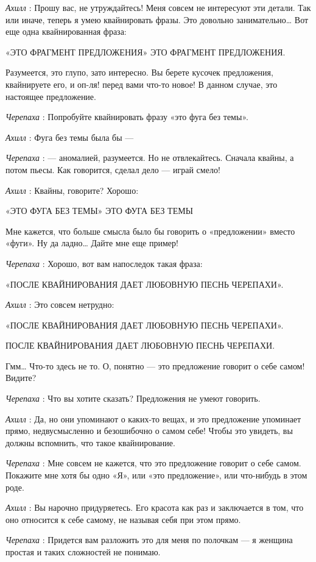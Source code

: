 \documentclass[../main.tex]{subfiles}
\begin{document}
\begin{dialogue}
\emph{Ахилл} : Прошу вас, не утруждайтесь! Меня совсем не интересуют эти детали. Так или иначе, теперь я умею квайнировать фразы. Это довольно занимательно\ldots{} Вот еще одна квайнированная фраза:

«ЭТО ФРАГМЕНТ ПРЕДЛОЖЕНИЯ» ЭТО ФРАГМЕНТ ПРЕДЛОЖЕНИЯ.

Разумеется, это глупо, зато интересно. Вы берете кусочек предложения, квайнируете его, и оп-ля! перед вами что-то новое! В данном случае, это настоящее предложение.

\emph{Черепаха} : Попробуйте квайнировать фразу «это фуга без темы».

\emph{Ахилл} : Фуга без темы была бы ---

\emph{Черепаха} : --- аномалией, разумеется. Но не отвлекайтесь. Сначала квайны, а потом пьесы. Как говорится, сделал дело --- играй смело!

\emph{Ахилл} : Квайны, говорите? Хорошо:

«ЭТО ФУГА БЕЗ ТЕМЫ» ЭТО ФУГА БЕЗ ТЕМЫ

Мне кажется, что больше смысла было бы говорить о «предложении» вместо «фуги». Ну да ладно\ldots{} Дайте мне еще пример!

\emph{Черепаха} : Хорошо, вот вам напоследок такая фраза:

«ПОСЛЕ КВАЙНИРОВАНИЯ ДАЕТ ЛЮБОВНУЮ ПЕСНЬ ЧЕРЕПАХИ».

\emph{Ахилл} : Это совсем нетрудно:

«ПОСЛЕ КВАЙНИРОВАНИЯ ДАЕТ ЛЮБОВНУЮ ПЕСНЬ ЧЕРЕПАХИ».

ПОСЛЕ КВАЙНИРОВАНИЯ ДАЕТ ЛЮБОВНУЮ ПЕСНЬ ЧЕРЕПАХИ.

Гмм\ldots{} Что-то здесь не то. О, понятно --- это предложение говорит о себе самом! Видите?

\emph{Черепаха} : Что вы хотите сказать? Предложения не умеют говорить.

\emph{Ахилл} : Да, но они упоминают о каких-то вещах, и это предложение упоминает прямо, недвусмысленно и безошибочно о самом себе! Чтобы это увидеть, вы должны вспомнить, что такое квайнирование.

\emph{Черепаха} : Мне совсем не кажется, что это предложение говорит о себе самом. Покажите мне хотя бы одно «Я», или «это предложение», или что-нибудь в этом роде.

\emph{Ахилл} : Вы нарочно придуряетесь. Его красота как раз и заключается в том, что оно относится к себе самому, не называя себя при этом прямо.

\emph{Черепаха} : Придется вам разложить это для меня по полочкам --- я женщина простая и таких сложностей не понимаю.


\end{dialogue}
\end{document}
